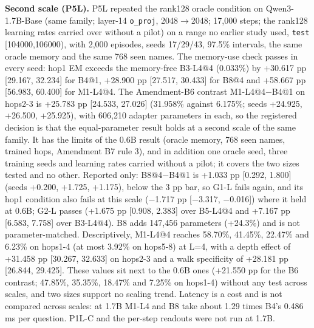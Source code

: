 \textbf{Second scale (P5L).} P5L repeated the rank128 oracle condition on Qwen3-1.7B-Base (same family; layer-14 \texttt{o\_proj}, 2048\ensuremath{\rightarrow}2048;
17,000 steps; the rank128 learning rates carried over without a pilot) on a range no earlier study used, \texttt{test} [104000,106000), with
2,000 episodes, seeds 17/\allowbreak{}29/\allowbreak{}43, 97.5\% intervals, the same oracle memory and the same 768 seen names. The memory-use check  %
passes in every seed: hop1 EM exceeds the memory-free B3-L4@4 (0.033\%) by +30.617 pp [29.167, 32.234] for B4@1, +28.900 pp [27.517, 30.433]
for B8@4 and +58.667 pp [56.983, 60.400] for M1-L4@4. The Amendment-B6 contrast M1-L4@4\ensuremath{-}B4@1 on hops2-3 is +25.783 pp  %
[24.533, 27.026] (31.958\% against 6.175\%; seeds +24.925, +26.500, +25.925), with 606,210 adapter parameters in each, so the registered
decision is that the equal-parameter result holds at a second scale of the same family. It has the limits of the  %
0.6B result (oracle memory, 768 seen names, trained hops, Amendment B7 rule 3), and in addition one oracle seed, three training seeds and
learning rates carried without a pilot; it covers the two sizes tested and no other. Reported only: B8@4\ensuremath{-}B4@1 is +1.033 pp  %
[0.292, 1.800] (seeds +0.200, +1.725, +1.175), below the 3 pp bar, so G1-L fails again, and its hop1 condition also fails at this scale
(\ensuremath{-}1.717 pp [\ensuremath{-}3.317, \ensuremath{-}0.016]) where it held at 0.6B; G2-L passes (+1.675 pp [0.908, 2.383] over B5-L4@4 and +7.167 pp [6.583, 7.758] over
B3-L4@4). B8 adds 147,456 parameters (+24.3\%) and is not parameter-matched. Descriptively,  %
M1-L4@4 reaches 58.70\%, 41.45\%, 22.47\% and 6.23\% on hops1-4 (at most 3.92\% on hops5-8) at L=4, with a depth effect of +31.458 pp [30.267, 32.633]
on hops2-3 and a walk specificity of +28.181 pp [26.844, 29.425]. These values sit next to the 0.6B ones (+21.550 pp for the  %
B6 contrast; 47.85\%, 35.35\%, 18.47\% and 7.25\% on hops1-4) without any test across scales, and two sizes support no scaling trend.
 Latency is a cost and is not compared across scales: at 1.7B M1-L4 and B8 take about 1.29 times B4’s 0.486 ms per question.  %
 P1L-C and the per-step readouts were not run at 1.7B.  %

